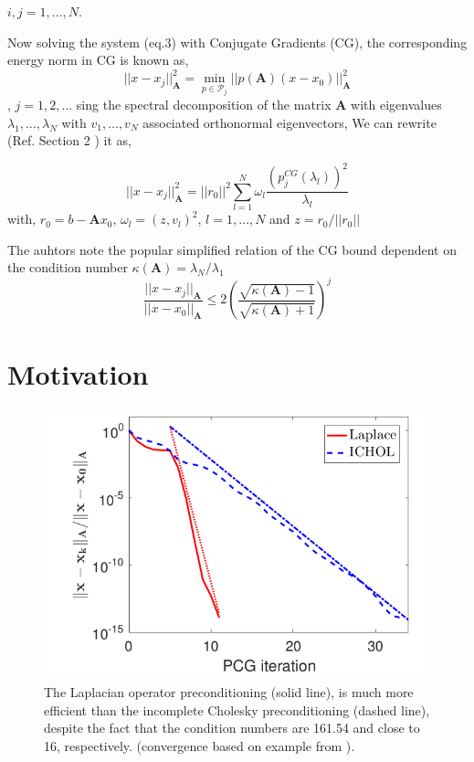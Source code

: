 $i,j = 1,\dots,N$.

Now solving the system (eq.3) with Conjugate Gradients (CG), the corresponding energy norm in CG is known as, 
$$||x-x_j||_{\mathbf{A}}^2= \min_{p\in\mathcal{P}_j}||p(\mathbf{A})(x-x_0)||^2_{\mathbf{A}}$$, $j=1,2,...$
sing the spectral decomposition of the matrix $\mathbf{A}$ with eigenvalues $\lambda_1,\dots,\lambda_N$ with $v_1,\dots,v_N$ associated orthonormal eigenvectors,
We can rewrite (Ref. Section 2 \cite{gergelits2019laplacian}) it as, 

$$||x-x_j||_{\mathbf{A}}^2= ||r_0||^2\sum_{l=1}^N \omega_l \frac{(p_j^{CG}(\lambda_l))^2}{\lambda_l}$$
with,
$r_0 = b-\mathbf{A}x_0$, $\omega_l = (z,v_l)^2$, $l=1,\dots,N$ and $z=r_0/||r_0||$

The auhtors note the popular simplified relation of the CG bound dependent on the condition number $\kappa(\mathbf{A}) = \lambda_N/\lambda_1$
\begin{equation}
  \label{eq:cgbound}
  \frac{||x-x_j||_{\mathbf{A}}}{||x-x_0||_{\mathbf{A}}}\leq 2 \left(\frac{\sqrt{\kappa(\mathbf{A})-1}}{\sqrt{\kappa(\mathbf{A})+1}}\right)^j
\end{equation}
\clearpage
\section{Motivation}
\label{sec:mot}
\begin{figure}[ht]
  \centering
  \includegraphics[scale=0.5]{explain.png}
  \caption{\label{fig:pcg}\cite[][Fig 1]{gergelits2019laplacian}The Laplacian operator preconditioning (solid line), is much more efficient than the incomplete Cholesky preconditioning (dashed line), despite the fact that the condition numbers are 161.54 and close to 16, respectively. (convergence based on example from \cite[]{gergelits2019laplacian}).}
\end{figure}

